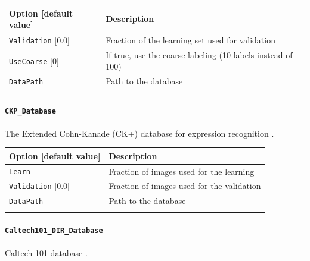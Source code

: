 \documentclass[a4paper,11pt,oneside]{article}
\begin{document}
\begin{center}
 \begin{tabular}{| p{5cm} | p{10cm} | }
 \hline
 Option [default value] & Description\\
 \hline\hline
  \lstinline!Validation! [0.0] & Fraction of the learning set used for
  validation \\
  \lstinline!UseCoarse! [0] & If true, use the coarse labeling
  (10 labels instead of 100) \\
  \lstinline!DataPath! & Path to the database \\
    & \\
 \hline
\end{tabular}
\end{center}

\paragraph{\texorpdfstring{%
\lstinline[basicstyle=\ttfamily\bfseries]!CKP_Database!}{CKP\_Database}}
The Extended Cohn-Kanade (CK+) database for expression recognition
\citep{Lucey2010}.

\begin{center}
 \begin{tabular}{| p{5cm} | p{10cm} | }
 \hline
 Option [default value] & Description\\
 \hline\hline
  \cellcolor{requiredcolor}
  \lstinline!Learn! & Fraction of images used for the learning \\
  \lstinline!Validation! [0.0] & Fraction of images used for the validation \\
  \lstinline!DataPath! & Path to the database \\
  \noindent [\lstinline!$N2D2_DATA!/cohn-kanade-images] & \\
 \hline
\end{tabular}
\end{center}


\paragraph{\texorpdfstring{\lstinline[basicstyle=\ttfamily\bfseries]!Caltech101_DIR_Database!}{Caltech101\_DIR\_Database}}
Caltech 101 database \citep{FeiFei2004}.
\end{document}
